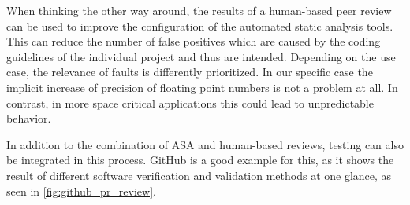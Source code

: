 \documentclass{scrreprt}
\begin{document}
When thinking the other way around, the results of a human-based peer review can be used to improve the configuration of the automated static analysis tools. This can reduce the number of false positives which are caused by the coding guidelines of the individual project and thus are intended.
Depending on the use case, the relevance of faults is differently prioritized. In our specific case the implicit increase of precision of floating point numbers is not a problem at all. In contrast, in more space critical applications this could lead to unpredictable behavior.

In addition to the combination of ASA and human-based reviews, testing can also be integrated in this process. GitHub is a good example for this, as it shows the result of different software verification and validation methods at one glance, as seen in \vref{fig:github_pr_review}.
\end{document}
